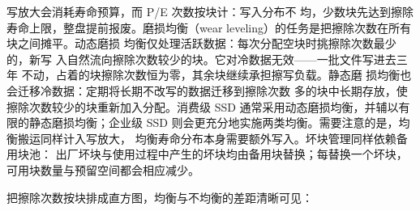 写放大会消耗寿命预算，而 P/E 次数按块计：写入分布不
均，少数块先达到擦除寿命上限，整盘提前报废。磨损均衡（wear
leveling）的任务是把擦除次数在所有块之间摊平。动态磨损
均衡仅处理活跃数据：每次分配空块时挑擦除次数最少的，新写
入自然流向擦除次数较少的块。它对冷数据无效——一批文件写进去三年
不动，占着的块擦除次数恒为零，其余块继续承担擦写负载。静态磨
损均衡也会迁移冷数据：定期将长期不改写的数据迁移到擦除次数
多的块中长期存放，使擦除次数较少的块重新加入分配。消费级 SSD 通常采用动态磨损均衡，并辅以有
限的静态磨损均衡；企业级 SSD 则会更充分地实施两类均衡。需要注意的是，均衡搬运同样计入写放大，
均衡寿命分布本身需要额外写入。坏块管理同样依赖备用块池：
出厂坏块与使用过程中产生的坏块均由备用块替换；每替换一个坏块，
可用块数量与预留空间都会相应减少。

把擦除次数按块排成直方图，均衡与不均衡的差距清晰可见：

